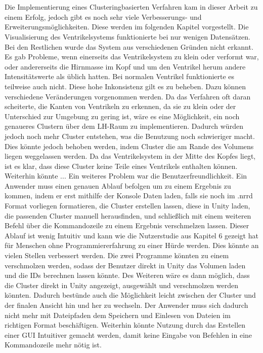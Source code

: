 \chapter{}
\label{sec:conclusion}



Die Implementierung eines Clusteringbasierten Verfahren kam in dieser Arbeit zu einem Erfolg, jedoch gibt es noch sehr viele Verbesserungs- und Erweiterungsmöglichkeiten. Diese werden im folgenden Kapitel vorgestellt.
\newline
Die Visualisierung des Ventrikelsystems funktionierte bei nur wenigen Datensätzen. Bei den Restlichen wurde das System aus verschiedenen Gründen nicht erkannt. Es gab Probleme, wenn einerseits das Ventrikelsystem zu klein oder verformt war, oder andererseits die Hirnmasse im Kopf und um den Ventrikel herum andere Intensitätswerte als üblich hatten. Bei normalen Ventrikel funktionierte es teilweise auch nicht. Diese hohe Inkonsistenz gilt es zu beheben. Dazu können verschiedene Veränderungen vorgenommen werden.
\newline
Da das Verfahren oft daran scheiterte, die Kanten von Ventrikeln zu erkennen, da sie zu klein oder der Unterschied zur Umgebung zu gering ist, wäre es eine Möglichkeit, ein noch genaueres Clustern über dem LH-Raum zu implementieren. Dadurch würden jedoch noch mehr Cluster entstehen, was die Benutzung noch schwieriger macht. Dies könnte jedoch behoben werden, indem Cluster die am Rande des Volumens liegen weggelassen werden. Da das Ventrikelsystem in der Mitte des Kopfes liegt, ist es klar, dass diese Cluster keine Teile eines Ventrikels enthalten können. Weiterhin könnte ...
\newline
Ein weiteres Problem war die Benutzerfreundlichkeit. Ein Anwender muss einen genauen Ablauf befolgen um zu einem Ergebnis zu kommen, indem er erst mithilfe der Konsole Daten laden, falls sie noch im .nrrd Format vorliegen formatieren, die Cluster erstellen lassen, diese in Unity laden, die passenden Cluster manuell herausfinden, und schließlich mit einem weiteren Befehl über die Kommandozeile zu einem Ergebnis verschmelzen lassen. Dieser Ablauf ist wenig Intuitiv und kann wie die Nutzerstudie aus Kapitel 6 gezeigt hat für Menschen ohne Programmiererfahrung zu einer Hürde werden.
\newline
Dies könnte an vielen Stellen verbessert werden. Die zwei Programme könnten zu einem verschmolzen werden, sodass der Benutzer direkt in Unity das Volumen laden und die IDs berechnen lassen könnte. Des Weiteren wäre es dann möglich, dass die Cluster direkt in Unity angezeigt, ausgewählt und verschmolzen werden könnten. Dadurch bestünde auch die Möglichkeit leicht zwischen der Cluster und der finalen Ansicht hin und her zu wechseln. Der Anwender muss sich dadurch nicht mehr mit Dateipfaden dem Speichern und Einlesen von Dateien im richtigen Format beschäftigen. Weiterhin könnte Nutzung durch das Erstellen einer GUI Intuitiver gemacht werden, damit keine Eingabe von Befehlen in eine Kommandozeile mehr nötig ist.
